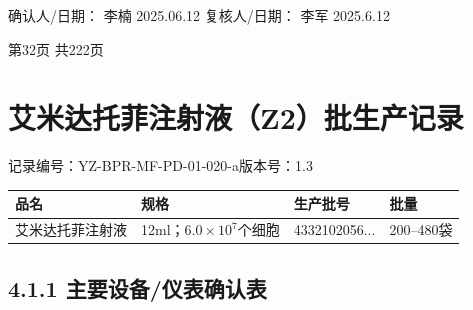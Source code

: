 \documentclass[UTF8,10pt,a4paper,fontset=fandol]{ctexart}
\newcommand{\fieldvalue}[1]{#1}
\newcommand{\handwritten}[1]{#1}
\begin{document}
确认人/日期：
\fieldvalue{\handwritten{李楠}}
\quad
\fieldvalue{\handwritten{2025.06.12}}
\hfill
复核人/日期：
\fieldvalue{\handwritten{李军}}
\quad
\fieldvalue{\handwritten{2025.6.12}}

\vfill

\begin{center}
第32页 共222页
\end{center}

\newpage

\section*{艾米达托菲注射液（Z2）批生产记录}

\noindent
记录编号：YZ-BPR-MF-PD-01-020-a\hfill 版本号：1.3

\begin{tabularx}{\textwidth}{|X|X|X|X|}
\hline
品名 & 规格 & 生产批号 & 批量\\
\hline
\fieldvalue{艾米达托菲注射液} &
\fieldvalue{12ml；$6.0\times10^{7}$个细胞} &
\fieldvalue{\handwritten{4332102056...}} &
\fieldvalue{200--480袋}\\
\hline
\end{tabularx}

\subsection*{4.1.1 主要设备/仪表确认表}
\end{document}
